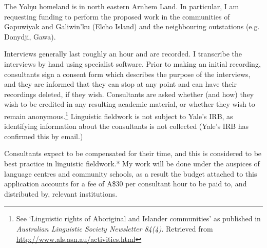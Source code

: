 \documentclass[11pt]{article}
\begin{document}
The Yolŋu homeland is in north eastern Arnhem Land. In particular, I am requesting funding to perform the proposed work in the communities of Gapuwiyak and Galiwin'ku (Elcho Island) and the neighbouring outstations (e.g. Donydji, Gawa).
	
	
Interviews generally last roughly an hour and are recorded. I transcribe the interviews by hand using specialist software. Prior to making an initial recording, consultants sign a consent form which describes the purpose of the interviews, and they are informed that they can stop at any point and can have their recordings deleted, if they wish. Consultants are asked whether (and how) they wish to be credited in any resulting academic material, or whether they wish to remain anonymous.\footnote[*]{See `Linguistic rights of Aboriginal and Islander communities' as published in \textit{Australian Linguistic Society Newsletter 84(4)}. Retrieved from \url{http://www.als.asn.au/activities.html}} Linguistic fieldwork is not subject to Yale’s IRB, as identifying information about the consultants is not collected (Yale’s IRB has confirmed this by email.)

Consultants expect to be compensated for their time, and this is considered to be best practice in linguistic fieldwork.* My work will be done under the auspices of language centres and community schools, as a result the budget attached to this application accounts for a fee of A\$30 per consultant hour to be paid to, and distributed by, relevant institutions. 
	
	
\end{document}
